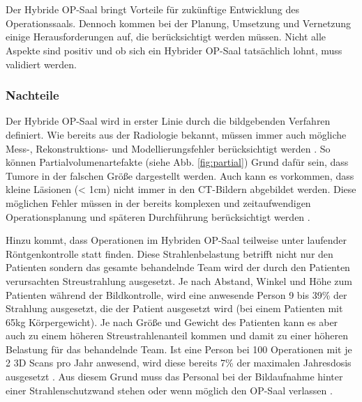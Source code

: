 \chapter{}
\label{sec:overview}

Der Hybride OP-Saal bringt Vorteile für zukünftige Entwicklung des Operationssaals. Dennoch kommen bei der Planung, Umsetzung und Vernetzung einige Herausforderungen auf, die berücksichtigt werden müssen. 
Nicht alle Aspekte sind positiv und ob sich ein Hybrider OP-Saal tatsächlich lohnt, muss validiert werden.

\subsection{Nachteile}

Der Hybride OP-Saal wird in erster Linie durch die bildgebenden Verfahren definiert. Wie bereits aus der Radiologie bekannt, müssen immer auch mögliche \glqq Mess-, Rekonstruktions- und Modellierungsfehler berücksichtigt werden\grqq{} \cite{DerDigitaleOperationssaal}. 
So können Partialvolumenartefakte (siehe Abb. \ref{fig:partial}) Grund dafür sein, dass Tumore in der falschen Größe dargestellt werden. Auch kann es vorkommen, dass kleine Läsionen (< 1cm) nicht immer in den CT-Bildern abgebildet werden. Diese möglichen Fehler müssen in der bereits komplexen und zeitaufwendigen Operationsplanung und späteren Durchführung berücksichtigt werden \cite{DerDigitaleOperationssaal}.

Hinzu kommt, dass Operationen im Hybriden OP-Saal teilweise unter laufender Röntgenkontrolle statt finden. Diese Strahlenbelastung betrifft nicht nur den Patienten sondern das gesamte behandelnde Team wird der durch den Patienten verursachten Streustrahlung ausgesetzt. Je nach Abstand, Winkel und Höhe zum Patienten während der Bildkontrolle, wird eine anwesende Person 9 bis 39\% der Strahlung ausgesetzt, die der Patient ausgesetzt wird (bei einem Patienten mit 65kg Körpergewicht). Je nach Größe und Gewicht des Patienten kann es aber auch zu einem höheren Streustrahlenanteil kommen und damit zu einer höheren Belastung für das behandelnde Team.
Ist eine Person bei 100 Operationen mit je 2 3D Scans pro Jahr anwesend, wird diese bereits 7\% der maximalen Jahresdosis ausgesetzt \cite{RadiationExposure}. Aus diesem Grund muss das Personal bei der Bildaufnahme hinter einer Strahlenschutzwand stehen oder wenn möglich den OP-Saal verlassen \cite{RadiationExposure}.

